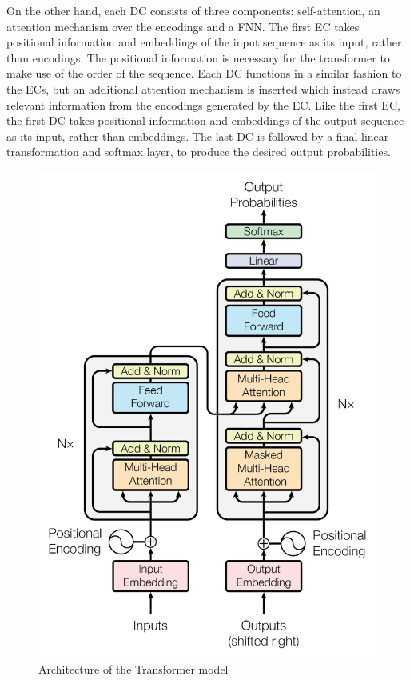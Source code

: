\documentclass[11pt,a4paper]{article}
\begin{document}
On the other hand, each DC consists of three components: self-attention, an attention mechanism over the encodings and a FNN. The first EC takes positional information and embeddings of the input sequence as its input, rather than encodings. The positional information is necessary for the transformer to make use of the order of the sequence. Each DC functions in a similar fashion to the ECs, but an additional attention mechanism is inserted which instead draws relevant information from the encodings generated by the EC. Like the first EC, the first DC takes positional information and embeddings of the output sequence as its input, rather than embeddings. The last DC is followed by a final linear transformation and softmax layer, to produce the desired output probabilities.

\begin{figure}[h]
    \centering
    \includegraphics[scale=0.5]{paper/images/Transformer.PNG}
    \caption{Architecture of the Transformer model}
    \label{fig:transformer}
\end{figure}
\end{document}
